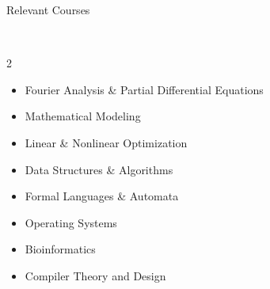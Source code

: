 \documentclass[9pt]{article}
\newenvironment{changemargin}[2]{%
  \begin{list}{}{%
    \setlength{\topsep}{0pt}%
    \setlength{\leftmargin}{#1}%
    \setlength{\rightmargin}{#2}%
    \setlength{\listparindent}{\parindent}%
    \setlength{\itemindent}{\parindent}%
    \setlength{\parsep}{\parskip}%
  }%
  \item[]}{\end{list}
}
\newcommand{\lineover}{
    \begin{changemargin}{-0.05in}{-0.05in}
        \vspace*{-8pt}
        \hrulefill \\
        \vspace*{-2pt}
    \end{changemargin}
}
\newcommand{\header}[1]{
    \begin{changemargin}{-0.5in}{-0.5in}
        {\large #1}\\
        \lineover
    \end{changemargin}
}
\newenvironment{body} {
    \vspace*{-16pt}
    \begin{changemargin}{-0.20in}{-0.5in}
  }
    {\end{changemargin}
}
\begin{document}
\header{Relevant Courses}
\begin{body}
    \vspace{4pt}
    \begin{multicols}{2}
        \begin{itemize} \itemsep -0pt
            \item [] Fourier Analysis \& Partial Differential Equations
            \item [] Mathematical Modeling
            \item [] Linear \& Nonlinear Optimization

            \item [] Data Structures \& Algorithms
            \item [] Formal Languages \& Automata
            \item [] Operating Systems
            \item [] Bioinformatics
            \item [] Compiler Theory and Design


\end{itemize}
\end{multicols}
\end{body}
\end{document}
